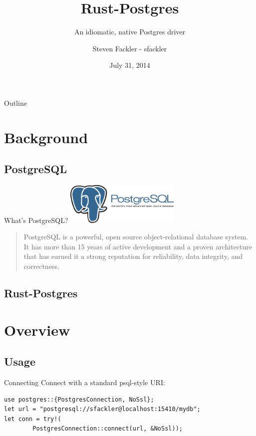 \documentclass{beamer}
\title{Rust-Postgres}
\subtitle{An idiomatic, native Postgres driver}
\author[sfackler]{Steven Fackler - sfackler}
\date{July 31, 2014}
\begin{document}
\begin{frame}
\titlepage
\end{frame}

\begin{frame}{Outline}
    \tableofcontents
\end{frame}

\section{Background}
\subsection{PostgreSQL}

\begin{frame}{What's PostgreSQL?}
	\includegraphics[height=2cm]{postgres_logo.pdf}

	\begin{quote}
		PostgreSQL is a powerful, open source object-relational database system. It has more than 15 years of active development and a proven architecture that has earned it a strong reputation for reliability, data integrity, and correctness.
	\end{quote}
\end{frame}

\subsection{Rust-Postgres}

\section{Overview}
\subsection{Usage}

\begin{frame}[fragile]{Connecting}
	Connect with a standard psql-style URI:
	\begin{verbatim}
use postgres::{PostgresConnection, NoSsl};
let url = "postgresql://sfackler@localhost:15410/mydb";
let conn = try!(
        PostgresConnection::connect(url, &NoSsl));
	\end{verbatim}	
\end{frame}
\end{document}
